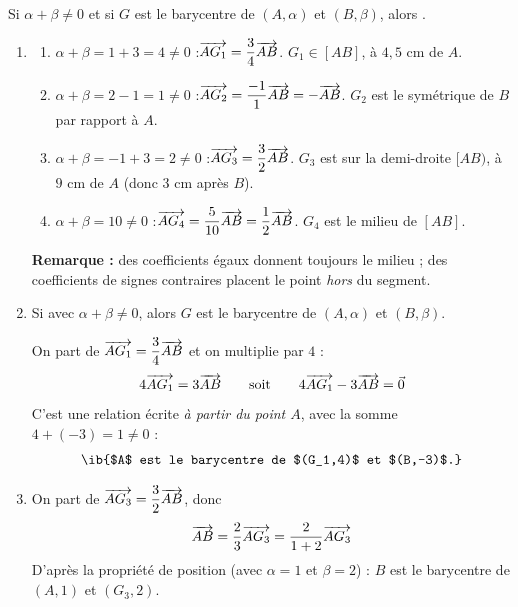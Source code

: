 \begin{center}
\end{center}
\begin{prop}
Si $\alpha+\beta\neq0$ et si $G$ est le barycentre de $(A,\alpha)$ et $(B,\beta)$, alors .
\end{prop}
\begin{enumerate}[itemsep=14pt]
  \item
  \begin{enumerate}[itemsep=8pt]
    \item $\alpha+\beta=1+3=4\neq0$ :\quad $\overrightarrow{AG_1}=\dfrac34\overrightarrow{AB}$. \quad $G_1\in[AB]$, à $4{,}5$ cm de $A$.
    \item $\alpha+\beta=2-1=1\neq0$ :\quad $\overrightarrow{AG_2}=\dfrac{-1}{1}\overrightarrow{AB}=-\overrightarrow{AB}$. \quad $G_2$ est le symétrique de $B$ par rapport à $A$.
    \item $\alpha+\beta=-1+3=2\neq0$ :\quad $\overrightarrow{AG_3}=\dfrac32\overrightarrow{AB}$. \quad $G_3$ est sur la demi-droite $[AB)$, à $9$ cm de $A$ (donc $3$ cm après $B$).
    \item $\alpha+\beta=10\neq0$ :\quad $\overrightarrow{AG_4}=\dfrac{5}{10}\overrightarrow{AB}=\dfrac12\overrightarrow{AB}$. \quad $G_4$ est le milieu de $[AB]$.
  \end{enumerate}
  \textbf{Remarque :} des coefficients égaux donnent toujours le milieu ; des coefficients de signes contraires placent le point \emph{hors} du segment.

  \item
  \begin{prop}
  Si  avec $\alpha+\beta\neq0$, alors $G$ est le barycentre de $(A,\alpha)$ et $(B,\beta)$.
  \end{prop}
  On part de $\overrightarrow{AG_1}=\dfrac34\overrightarrow{AB}$ et on multiplie par $4$ :
  \[4\overrightarrow{AG_1}=3\overrightarrow{AB}\qquad\text{soit}\qquad4\overrightarrow{AG_1}-3\overrightarrow{AB}=\vec0\]
  C'est une relation écrite \emph{à partir du point $A$}, avec la somme $4+(-3)=1\neq0$ :
  \[\ib{$A$ est le barycentre de $(G_1,4)$ et $(B,-3)$.}\]

  \item On part de $\overrightarrow{AG_3}=\dfrac32\overrightarrow{AB}$, donc
  \[\overrightarrow{AB}=\dfrac23\overrightarrow{AG_3}=\dfrac{2}{1+2}\overrightarrow{AG_3}\]
  D'après la propriété de position (avec $\alpha=1$ et $\beta=2$) : $B$ est le barycentre de $(A,1)$ et $(G_3,2)$.
\end{enumerate}
